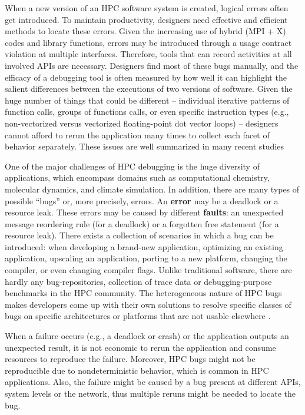 ﻿When a new version of an HPC software system is created, logical errors often get introduced.
%
To maintain productivity, designers need effective and efficient methods to locate these errors.
%
Given the increasing use of hybrid (MPI + X) codes and library functions, errors may be introduced through a usage contract violation at multiple interfaces.
%
Therefore, tools that can record activities at all involved APIs are necessary.
%
Designers find most of these bugs manually, and the efficacy of a debugging tool is
often measured by how well it can highlight the salient differences between the
executions of two versions of software.
%
Given the huge number of things that could be different -- individual iterative
patterns of function calls, groups of functions calls, or even specific instruction
types (e.g., non-vectorized versus vectorized floating-point dot vector loops) -- designers
cannot afford to rerun the application many times to collect each facet
of behavior separately.
%
These issues are well summarized in many recent studies \cite{hpcdoe}


One of the major challenges of HPC debugging is the huge diversity of applications, which encompass domains such as computational chemistry, molecular dynamics, and climate simulation.
%
In addition, there are many types of possible “bugs” or, more precisely, errors. An \textbf{error} may be a deadlock or a resource leak. These errors may be caused by different \textbf{faults}: an unexpected message reordering rule (for a deadlock) or a forgotten free statement (for a resource leak).
%
There exists a collection of scenarios in which a bug can be introduced: when developing a brand-new application, optimizing an existing application, upscaling an application, porting to a new platform, changing the compiler, or even changing compiler flags.
%
Unlike traditional software, there are hardly any bug-repositories, collection of trace data or debugging-purpose benchmarks in the HPC community.
%
The heterogeneous nature of HPC bugs makes developers come up with their own solutions to resolve specific classes of bugs on specific architectures or platforms that are not usable elsewhere \cite{hpcdoe}.

When a failure occurs (e.g., a deadlock or crash) or the application outputs an unexpected result, it is not economic to rerun the application and consume resources to reproduce the failure. Moreover, HPC bugs might not be reproducible due to nondeterministic behavior, which is common in HPC applications. Also, the failure might be caused by a bug present at different APIs, system levels or the network, thus multiple reruns might be needed to locate the bug.

